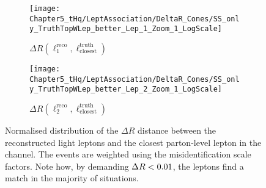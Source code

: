 \begin{figure}[ht]
    \centering
    \begin{subfigure}[b]{0.495\textwidth}
        \centering
        \texttt{[image: Chapter5\_tHq/LeptAssociation/DeltaR\_Cones/SS\_only\_TruthTopWLep\_better\_Lep\_1\_Zoom\_1\_LogScale]}
        \caption{$\Delta R(\ell_{1}^{\text{reco}}, \ell_{\text{closest}}^{\text{truth}})$}
    \end{subfigure}
    \hfill %
    \begin{subfigure}[b]{0.495\textwidth}
        \centering
        \texttt{[image: Chapter5\_tHq/LeptAssociation/DeltaR\_Cones/SS\_only\_TruthTopWLep\_better\_Lep\_2\_Zoom\_1\_LogScale]}
        \caption{$\Delta R(\ell_{2}^{\text{reco}}, \ell_{\text{closest}}^{\text{truth}})$}
    \end{subfigure}   
    \caption{Normalised distribution of the $\Delta R$ distance between the reconstructed light leptons and the 
    closest parton-level lepton in the \dilepSStau channel. The events are weighted using the misidentification scale factors. 
    Note how, by demanding $\Delta R < 0.01$, the leptons find a match in the majority of situations.}
    \label{fig:chap:tH:LepAssign:DeltaR}
\end{figure}



